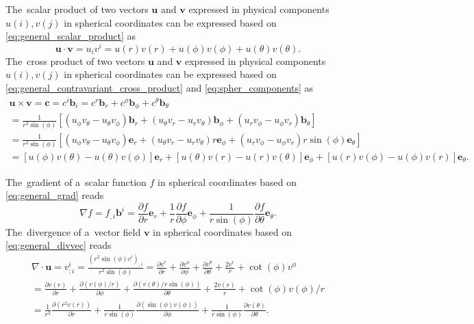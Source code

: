 \documentclass[preprint,12pt]{elsarticle}
\newcommand{\pdv}[2]{\frac{\partial{#1}}{\partial{#2}}}
\newcommand{\vect}[1]{\boldsymbol{#1}}
\newcounter{bla}
\begin{document}
The~scalar product of two vectors $\vect{u}$ and $\vect{v}$ expressed 
in physical components $u(i), v(j)$ in spherical coordinates can be expressed 
based on \eqref{eq:general_scalar_product} as
\begin{equation}
  \vect{u}\cdot\vect{v} = u_i v^i = u(r)v(r) + u(\phi)v(\phi) 
  + u(\theta)v(\theta) .
  \label{eq:spher_scalar_product}
\end{equation}
The~cross product of two vectors $\vect{u}$ and $\vect{v}$ expressed 
in physical components $u(i), v(j)$ in spherical coordinates can be expressed 
based on \eqref{eq:general_contravariant_cross_product} 
and \eqref{eq:spher_components} as
\begin{multline}
  \vect{u}\times\vect{v} = \vect{c} = c^i \vect{b}_i = 
  c^r \vect{b}_r + c^\phi \vect{b}_\phi
  + c^\theta \vect{b}_\theta \\
  = \frac{1}{r^2\sin(\phi)}\left[
  (u_\phi v_\theta - u_\theta v_\phi) \vect{b}_r 
  +  (u_\theta v_r - u_r v_\theta) \vect{b}_\phi
  +  (u_r v_\phi - u_\phi v_r)\vect{b}_\theta
  \right] \\
  = \frac{1}{r^2\sin(\phi)}\left[
  (u_\phi v_\theta - u_\theta v_\phi) \vect{e}_r 
  +  (u_\theta v_r - u_r v_\theta) r\vect{e}_\phi
  +  (u_r v_\phi - u_\phi v_r)r\sin(\phi)\vect{e}_\theta
  \right] \\
 = [u(\phi) v(\theta) - u(\theta) v(\phi)] \vect{e}_r
 + [u(\theta) v(r) - u(r) v(\theta)] \vect{e}_\phi
 + [u(r) v(\phi) - u(\phi) v(r)]\vect{e}_\theta .
 \label{eq:spher_cross_product}
\end{multline}

The~gradient of a~scalar function $f$ in spherical coordinates based on 
\eqref{eq:general_grad} reads
\begin{equation}
  \nabla f = f_{,i}\vect{b}^i = \pdv{f}{r}\vect{e}_r 
  + \frac{1}{r}\pdv{f}{\phi}\vect{e}_\phi
  + \frac{1}{r\sin(\phi)}\pdv{f}{\theta}\vect{e}_{\theta} .
  \label{eq:spher_gradf}
\end{equation}
The~divergence of a~vector field $\vect{v}$ in spherical coordinates based on
\eqref{eq:general_divvec} reads
\begin{multline}
  \nabla\cdot\vect{u} = v^i_{;i} = 
  \frac{(r^2\sin(\phi)v^i)_{,i}}{r^2\sin(\phi)}
  = \pdv{v^r}{r} + \pdv{v^\phi}{\phi} + \pdv{v^\theta}{\theta} 
  + \frac{2v^r}{r} + \cot(\phi) v^\phi \\
  = \pdv{v(r)}{r} + \pdv{(v(\phi)/r)}{\phi} 
  + \pdv{(v(\theta)/r\sin(\phi))}{\theta} 
  + \frac{2 v(r)}{r} + \cot(\phi) v(\phi)/r \\
  = \frac{1}{r^2}\pdv{(r^2v(r))}{r} 
  + \frac{1}{r\sin(\phi)}\pdv{(\sin(\phi)v(\phi))}{\phi} 
  + \frac{1}{r\sin(\phi)}\pdv{v(\theta)}{\theta} .
  \label{eq:spher_gradf}
\end{multline}
\end{document}
